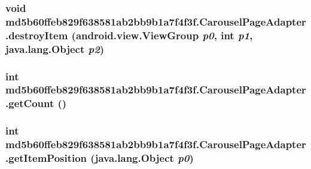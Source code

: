 \hypertarget{classmd5b60ffeb829f638581ab2bb9b1a7f4f3f_1_1_carousel_page_adapter_c769d6b98fd82eba086700268f65e1b0}{
\subsubsection[{destroyItem}]{\setlength{\rightskip}{0pt plus 5cm}void md5b60ffeb829f638581ab2bb9b1a7f4f3f.CarouselPageAdapter.destroyItem (android.view.ViewGroup {\em p0}, \/  int {\em p1}, \/  java.lang.Object {\em p2})}}
\label{classmd5b60ffeb829f638581ab2bb9b1a7f4f3f_1_1_carousel_page_adapter_c769d6b98fd82eba086700268f65e1b0}


\hypertarget{classmd5b60ffeb829f638581ab2bb9b1a7f4f3f_1_1_carousel_page_adapter_0e49bdba4f14c96d9de8981bdcd0654c}{
\subsubsection[{getCount}]{\setlength{\rightskip}{0pt plus 5cm}int md5b60ffeb829f638581ab2bb9b1a7f4f3f.CarouselPageAdapter.getCount ()}}
\label{classmd5b60ffeb829f638581ab2bb9b1a7f4f3f_1_1_carousel_page_adapter_0e49bdba4f14c96d9de8981bdcd0654c}


\hypertarget{classmd5b60ffeb829f638581ab2bb9b1a7f4f3f_1_1_carousel_page_adapter_3033cdd51c82c723fde4d8a68493d1a1}{
\subsubsection[{getItemPosition}]{\setlength{\rightskip}{0pt plus 5cm}int md5b60ffeb829f638581ab2bb9b1a7f4f3f.CarouselPageAdapter.getItemPosition (java.lang.Object {\em p0})}}
\label{classmd5b60ffeb829f638581ab2bb9b1a7f4f3f_1_1_carousel_page_adapter_3033cdd51c82c723fde4d8a68493d1a1}


